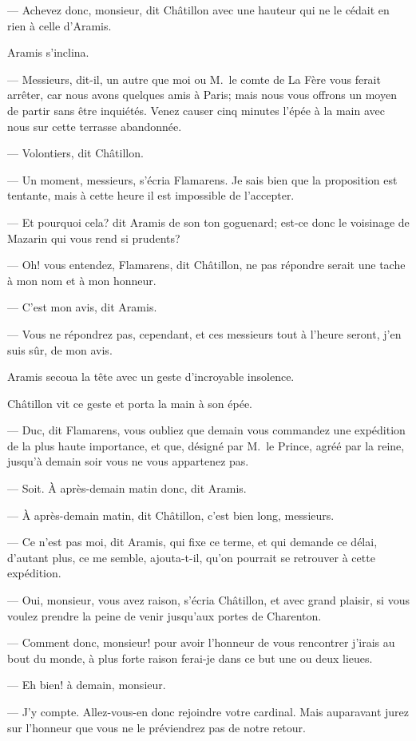 — Achevez donc, monsieur, dit Châtillon avec une hauteur qui ne le cédait en rien à celle d'Aramis.

Aramis s'inclina.

— Messieurs, dit-il, un autre que moi ou M.~le comte de La Fère vous ferait arrêter, car nous avons quelques amis à Paris; mais nous vous offrons un moyen de partir sans être inquiétés. Venez causer cinq minutes l'épée à la main avec nous sur cette terrasse abandonnée.

— Volontiers, dit Châtillon.

— Un moment, messieurs, s'écria Flamarens. Je sais bien que la proposition est tentante, mais à cette heure il est impossible de l'accepter.

— Et pourquoi cela? dit Aramis de son ton goguenard; est-ce donc le voisinage de Mazarin qui vous rend si prudents?

— Oh! vous entendez, Flamarens, dit Châtillon, ne pas répondre serait une tache à mon nom et à mon honneur.

— C'est mon avis, dit Aramis.

— Vous ne répondrez pas, cependant, et ces messieurs tout à l'heure seront, j'en suis sûr, de mon avis.

Aramis secoua la tête avec un geste d'incroyable insolence.

Châtillon vit ce geste et porta la main à son épée.

— Duc, dit Flamarens, vous oubliez que demain vous commandez une expédition de la plus haute importance, et que, désigné par M.~le Prince, agréé par la reine, jusqu'à demain soir vous ne vous appartenez pas.

— Soit. À après-demain matin donc, dit Aramis.

— À après-demain matin, dit Châtillon, c'est bien long, messieurs.

— Ce n'est pas moi, dit Aramis, qui fixe ce terme, et qui demande ce délai, d'autant plus, ce me semble, ajouta-t-il, qu'on pourrait se retrouver à cette expédition.

— Oui, monsieur, vous avez raison, s'écria Châtillon, et avec grand plaisir, si vous voulez prendre la peine de venir jusqu'aux portes de Charenton.

— Comment donc, monsieur! pour avoir l'honneur de vous rencontrer j'irais au bout du monde, à plus forte raison ferai-je dans ce but une ou deux lieues.

— Eh bien! à demain, monsieur.

— J'y compte. Allez-vous-en donc rejoindre votre cardinal. Mais auparavant jurez sur l'honneur que vous ne le préviendrez pas de notre retour.


